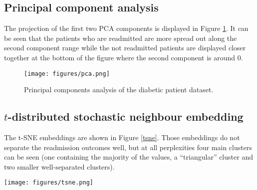 \documentclass[10pt, twocolumn]{article}
\begin{document}
\subsection{Principal component analysis}

The projection of the first two PCA components is displayed in Figure \ref{pca}. It can be seen that the patients who are readmitted are more spread out along the second component range while the not readmitted patients are displayed closer together at the bottom of the figure where the second component is around 0.

\begin{figure}[htb!]
	\centering
	\texttt{[image: figures/pca.png]}
	\caption{Principal components analysis of the diabetic patient dataset.}\label{pca}
\end{figure}

\subsection{$t$-distributed stochastic neighbour embedding}
The t-SNE embeddings are shown in Figure \ref{tsne}. Those embeddings do not separate the readmission outcomes well, but at all perplexities four main clusters can be seen (one containing the majority of the values, a ``triangular'' cluster and two smaller well-separated clusters).

\begin{figure*}[t!]
	\centering
	\texttt{[image: figures/tsne.png]}
	\caption{t-SNE embeddings of the diabetic patient dataset for selected perplexities.}\label{tsne}
  \end{figure*}

\medskip
 


\end{document}
